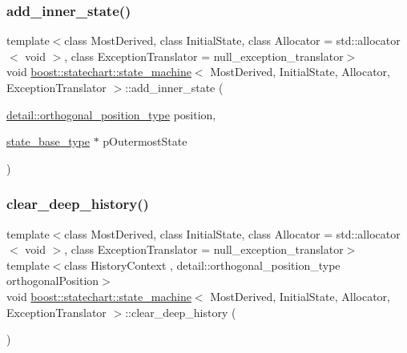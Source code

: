 \mbox{\label{classboost_1_1statechart_1_1state__machine_ae3cebe8b5870bda788a95be852e5d3be}} 
\subsubsection{\texorpdfstring{add\+\_\+inner\+\_\+state()}{add\_inner\_state()}}
{\footnotesize\ttfamily template$<$class Most\+Derived, class Initial\+State, class Allocator = std\+::allocator$<$ void $>$, class Exception\+Translator = null\+\_\+exception\+\_\+translator$>$ \\
void \mbox{\hyperlink{classboost_1_1statechart_1_1state__machine}{boost\+::statechart\+::state\+\_\+machine}}$<$ Most\+Derived, Initial\+State, Allocator, Exception\+Translator $>$\+::add\+\_\+inner\+\_\+state (\begin{DoxyParamCaption}\item[{\mbox{\hyperlink{namespaceboost_1_1statechart_1_1detail_a3bedea0b807a16fa222733417183d2c9}{detail\+::orthogonal\+\_\+position\+\_\+type}}}]{position,  }\item[{\mbox{\hyperlink{classboost_1_1statechart_1_1state__machine_a69cc258c29fcabec25c5dc8bedb7d530}{state\+\_\+base\+\_\+type}} $\ast$}]{p\+Outermost\+State }\end{DoxyParamCaption})\hspace{0.3cm}{\ttfamily [inline]}}

\mbox{\label{classboost_1_1statechart_1_1state__machine_a5b60164ba8ab165421fad2ecbccad4e8}} 
\subsubsection{\texorpdfstring{clear\+\_\+deep\+\_\+history()}{clear\_deep\_history()}}
{\footnotesize\ttfamily template$<$class Most\+Derived, class Initial\+State, class Allocator = std\+::allocator$<$ void $>$, class Exception\+Translator = null\+\_\+exception\+\_\+translator$>$ \\
template$<$class History\+Context , detail\+::orthogonal\+\_\+position\+\_\+type orthogonal\+Position$>$ \\
void \mbox{\hyperlink{classboost_1_1statechart_1_1state__machine}{boost\+::statechart\+::state\+\_\+machine}}$<$ Most\+Derived, Initial\+State, Allocator, Exception\+Translator $>$\+::clear\+\_\+deep\+\_\+history (\begin{DoxyParamCaption}{ }\end{DoxyParamCaption})\hspace{0.3cm}{\ttfamily [inline]}}

